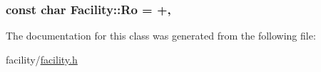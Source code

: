 \subsubsection[{\texorpdfstring{Ro}{Ro}}]{\setlength{\rightskip}{0pt plus 5cm}const char Facility\+::\+Ro = \textquotesingle{}+\textquotesingle{}\hspace{0.3cm}{\ttfamily [static]}, {\ttfamily [protected]}}\hypertarget{classFacility_ac6279190b255cdb87040af59e849543a}{}\label{classFacility_ac6279190b255cdb87040af59e849543a}


The documentation for this class was generated from the following file\+:\begin{DoxyCompactItemize}
\item 
facility/\hyperlink{facility_8h}{facility.\+h}\end{DoxyCompactItemize}

